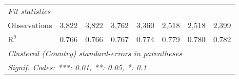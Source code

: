 \begin{tabular}{lccccccc}
   \midrule \emph{Fit statistics}\\
   Observations                                                                        & 3,822        & 3,822        & 3,762       & 3,360   & 2,518        & 2,518        & 2,399\\  
   R$^2$                                                                               & 0.766        & 0.766        & 0.767       & 0.774   & 0.779        & 0.780        & 0.782\\  
   \midrule
   \multicolumn{8}{l}{\emph{Clustered (Country) standard-errors in parentheses}}\\
   \multicolumn{8}{l}{\emph{Signif. Codes: ***: 0.01, **: 0.05, *: 0.1}}\\
\end{tabular}
\par\endgroup


